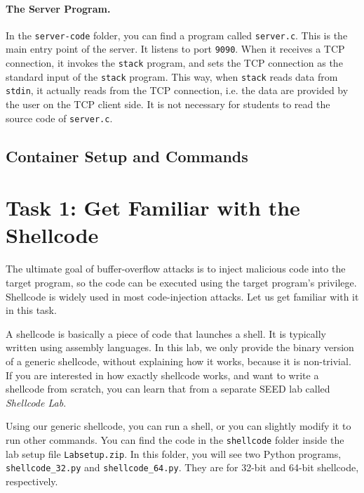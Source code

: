 \paragraph{The Server Program.} 
In the \texttt{server-code} folder, you can find a program called \texttt{server.c}. 
This is the main entry point of the server. It listens to port \texttt{9090}. 
When it receives a TCP connection, it 
invokes the \texttt{stack} program, and sets the TCP connection
as the standard input of the \texttt{stack} program. This way,
when \texttt{stack} reads data from \texttt{stdin}, it actually 
reads from the TCP connection, i.e. the data are provided by
the user on the TCP client side. It is not necessary for 
students to read the source code of \texttt{server.c}.  


\subsection{Container Setup and Commands}








\section{Task 1: Get Familiar with the Shellcode}

The ultimate goal of buffer-overflow attacks is to inject
malicious code into the target program, so the code can be
executed using the target program's privilege.
Shellcode is widely used in most code-injection attacks.
Let us get familiar with it in this task.


A shellcode is basically a piece of code that launches a shell.
It is typically written using assembly languages.  
In this lab, we only provide the binary version of a generic shellcode,
without explaining how it works, because it is non-trivial. 
If you are interested in how exactly shellcode works, and 
want to write a shellcode from scratch, you 
can learn that from a separate SEED lab called \textit{Shellcode Lab}.


Using our generic shellcode, you can run a shell, 
or you can slightly modify it 
to run other commands. You can find the code 
in the \texttt{shellcode} folder inside the lab setup file \texttt{Labsetup.zip}.
In this folder, you will see two Python programs, 
\texttt{shellcode\_32.py} and \texttt{shellcode\_64.py}. 
They are for 32-bit and 64-bit shellcode, respectively. 


